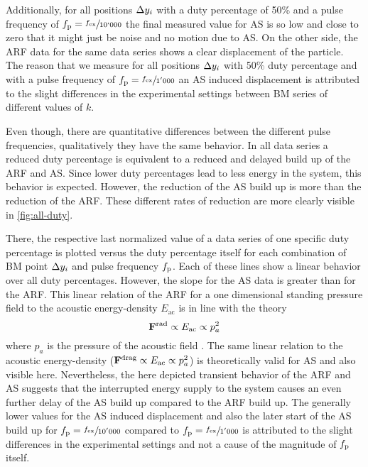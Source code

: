 Additionally, for all positions $\Delta y_{i}$ with a duty percentage of 50\% and a 
pulse frequency of $f_{\mathrm{p}}=\sfrac{f_{\mathrm{ex}}}{10`000}$ the final measured value for AS 
is so low and close to zero that it might just be noise and no motion due to 
AS. On the other side, the ARF data for the same data series shows a clear 
displacement of the particle. The reason that we measure for all positions 
$\Delta y_{i}$ with 50\% duty percentage and with a pulse frequency of 
$f_{\mathrm{p}}=\sfrac{f_{\mathrm{ex}}}{1'000}$ an AS induced displacement is attributed to the 
slight differences in the experimental settings between BM series of different 
values of $k$.

Even though, there are quantitative differences between the different pulse 
frequencies, qualitatively they have the same behavior. In all data series a 
reduced duty percentage is equivalent to a reduced and delayed build up of the 
ARF and AS. Since lower duty percentages lead to less energy in the system, 
this behavior is expected. However, the reduction of the AS build up is more 
than the reduction of the ARF. These different rates of reduction are more 
clearly visible in \cref{fig:all-duty}.

There, the respective last normalized value of a data series of one specific 
duty percentage is plotted versus the duty percentage itself for each 
combination of BM point $\Delta y_{i}$ and pulse frequency $f_{\mathrm{p}}$. Each of these 
lines show a linear behavior over all duty percentages. However, the slope for 
the AS data is greater than for the ARF. This linear relation of the ARF for a 
one dimensional standing pressure field to the acoustic energy-density 
$E_{\mathrm{ac}}$ is in line with the theory
\begin{equation*}
  \vb{F}^{\mathrm{rad}}\propto E_{\mathrm{ac}} \propto p_{a}^{2}
\end{equation*}
where $p_{a}$ is the pressure of the acoustic field 
\cite{Gorkov1962,Bruus2012}. The same linear relation to the acoustic 
energy-density ($\vb{F}^{\mathrm{drag}}\propto E_{\mathrm{ac}}\propto p_{a}^{2}$) is 
theoretically valid for AS \cite{Bach2020} and also visible here. Nevertheless, 
the here depicted transient behavior of the ARF and AS suggests that the 
interrupted energy supply to the system causes an even further delay of the AS 
build up compared to the ARF build up. The generally lower values for the AS 
induced displacement and also the later start of the AS build up for 
$f_{\mathrm{p}}=\sfrac{f_{\mathrm{ex}}}{10'000}$ compared to $f_{\mathrm{p}}=\sfrac{f_{\mathrm{ex}}}{1'000}$ is attributed 
to the slight differences in the experimental settings and not a cause of the 
magnitude of $f_{\mathrm{p}}$ itself.

